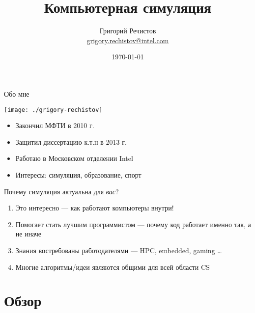 \documentclass{beamer}
\title{Компьютерная симуляция }
\author[Григорий Речистов]{Григорий Речистов \\ \small{\href{mailto:grigory.rechistov@intel.com}{grigory.rechistov@intel.com}}}
\date{\today}
\begin{document}
\begin{frame}
\titlepage
\end{frame}

\begin{frame}
\tableofcontents
\end{frame} 

\begin{frame}{Обо мне}

\raggedleft \texttt{[image: ./grigory-rechistov]}

\begin{itemize}
\item Закончил МФТИ в 2010 г.
\item Защитил диссертацию к.т.н в 2013 г.
\item Работаю в Московском отделении Intel 
\item Интересы: симуляция, образование, спорт

\end{itemize}


\end{frame} 

\begin{frame}{Почему симуляция актуальна для \emph{вас}?}

\begin{enumerate}
\item Это интересно --- как работают компьютеры внутри!
\item Помогает стать лучшим программистом --- почему код работает именно так, а не иначе
\item Знания востребованы работодателями --- HPC, embedded, gaming \dots
\item Многие алгоритмы/идеи являются общими для всей области CS
\end{enumerate}

\end{frame} 


\section{Обзор}
\end{document}
